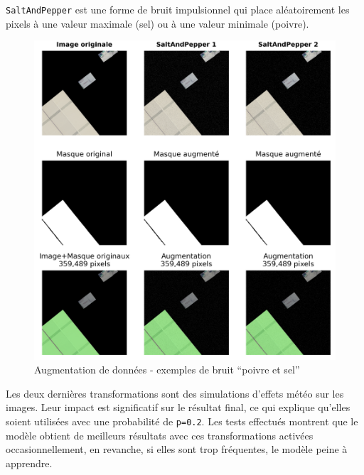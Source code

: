 \newpage
\texttt{SaltAndPepper} est une forme de bruit impulsionnel qui place aléatoirement les pixels à une valeur maximale (sel) ou à une valeur minimale (poivre).
\begin{figure}[H]
    \centering
    \includegraphics[width=1\linewidth]{02-main/figures/ch3/ch36_augmentations_11_bruit_poivre_et_sel.png}
    \caption{Augmentation de données - exemples de bruit ``poivre et sel''}
    \label{fig:ch36_augmentations_11_bruit_poivre_et_sel}
\end{figure}

\newpage
Les deux dernières transformations sont des simulations d'effets météo sur les images. Leur impact est significatif sur le résultat final, ce qui explique qu'elles soient utilisées avec une probabilité de \texttt{p=0.2}. Les tests effectués montrent que le modèle obtient de meilleurs résultats avec ces transformations activées occasionnellement, en revanche, si elles sont trop fréquentes, le modèle peine à apprendre.

